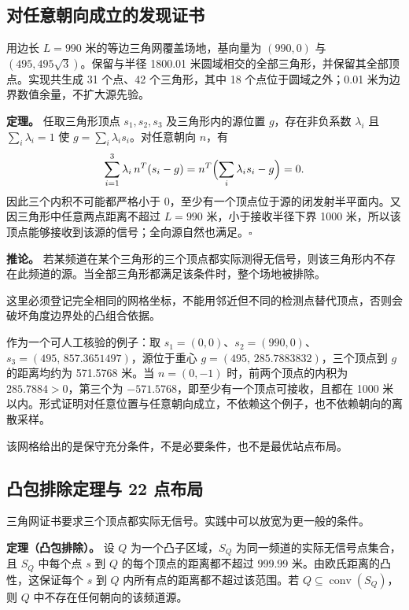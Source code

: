 \subsection{对任意朝向成立的发现证书}
\label{sec:q4-mesh}

用边长 $L=990$ 米的等边三角网覆盖场地，基向量为 $(990,0)$ 与 $(495,495\sqrt3)$。保留与半径 1800.01 米圆域相交的全部三角形，并保留其全部顶点。实现共生成 31 个点、42 个三角形，其中 18 个点位于圆域之外；0.01 米为边界数值余量，不扩大源先验。

\textbf{定理。} 任取三角形顶点 $s_1,s_2,s_3$ 及三角形内的源位置 $g$，存在非负系数 $\lambda_i$ 且 $\sum_i\lambda_i=1$ 使 $g=\sum_i\lambda_is_i$。对任意朝向 $n$，有
\begin{equation}
  \sum_{i=1}^{3}\lambda_i\,n^{T}(s_i-g)
  =n^{T}\Bigl(\sum_i\lambda_is_i-g\Bigr)=0 .
  \label{eq:convex-comb}
\end{equation}
因此三个内积不可能都严格小于 0，至少有一个顶点位于源的闭发射半平面内。又因三角形中任意两点距离不超过 $L=990$ 米，小于接收半径下界 1000 米，所以该顶点能够接收到该源的信号；全向源自然也满足。$\square$

\textbf{推论。} 若某频道在某个三角形的三个顶点都实际测得无信号，则该三角形内不存在此频道的源。当全部三角形都满足该条件时，整个场地被排除。

这里必须登记完全相同的网格坐标，不能用邻近但不同的检测点替代顶点，否则会破坏角度边界处的凸组合依据。

作为一个可人工核验的例子：取 $s_1=(0,0)$、$s_2=(990,0)$、$s_3=(495,\,857.3651497)$，源位于重心 $g=(495,\,285.7883832)$，三个顶点到 $g$ 的距离均约为 571.5768 米。当 $n=(0,-1)$ 时，前两个顶点的内积为 $285.7884>0$，第三个为 $-571.5768$，即至少有一个顶点可接收，且都在 1000 米以内。形式证明对任意位置与任意朝向成立，不依赖这个例子，也不依赖朝向的离散采样。

该网格给出的是保守充分条件，不是必要条件，也不是最优站点布局。

\subsection{凸包排除定理与 22 点布局}

三角网证书要求三个顶点都实际无信号。实践中可以放宽为更一般的条件。

\textbf{定理（凸包排除）。} 设 $Q$ 为一个凸子区域，$S_Q$ 为同一频道的实际无信号点集合，且 $S_Q$ 中每个点 $s$ 到 $Q$ 的每个顶点的距离都不超过 999.99 米。由欧氏距离的凸性，这保证每个 $s$ 到 $Q$ 内所有点的距离都不超过该范围。若 $Q\subseteq\operatorname{conv}(S_Q)$，则 $Q$ 中不存在任何朝向的该频道源。

